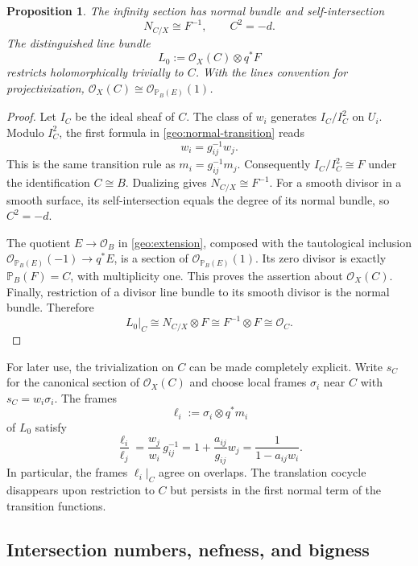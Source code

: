 \documentclass[11pt,a4paper]{article}
\numberwithin{equation}{section}
\newtheorem{proposition}[theorem]{Proposition}
\theoremstyle{definition}
\theoremstyle{remark}
\renewcommand{\P}{\mathbb P}
\newcommand{\OO}{\mathcal O}
\begin{document}
\begin{proposition}\label{geo:normal-and-L}
The infinity section has normal bundle and self-intersection
\[
  N_{C/X}\cong F^{-1},\qquad C^2=-d.
\]
The distinguished line bundle
\begin{equation}\label{geo:L-definition}
  L_0:=\OO_X(C)\otimes q^*F
\end{equation}
restricts holomorphically trivially to $C$.  With the lines convention
for projectivization, $\OO_X(C)\cong\OO_{\P_B(E)}(1)$.
\end{proposition}

\begin{proof}
Let $I_C$ be the ideal sheaf of $C$.  The class of $w_i$ generates
$I_C/I_C^2$ on $U_i$.  Modulo $I_C^2$, the first formula in
\eqref{geo:normal-transition} reads
\[
  w_i=g_{ij}^{-1}w_j.
\]
This is the same transition rule as $m_i=g_{ij}^{-1}m_j$.
Consequently $I_C/I_C^2\cong F$ under the identification $C\cong B$.
Dualizing gives $N_{C/X}\cong F^{-1}$.  For a smooth divisor in a
smooth surface, its self-intersection equals the degree of its normal
bundle, so $C^2=-d$.

The quotient $E\to\OO_B$ in \eqref{geo:extension}, composed with the
tautological inclusion $\OO_{\P_B(E)}(-1)\to q^*E$, is a section of
$\OO_{\P_B(E)}(1)$.  Its zero divisor is exactly $\P_B(F)=C$, with
multiplicity one.  This proves the assertion about $\OO_X(C)$.
Finally, restriction of a divisor line bundle to its smooth divisor
is the normal bundle.  Therefore
\[
  L_0|_C
   \cong N_{C/X}\otimes F
   \cong F^{-1}\otimes F
   \cong\OO_C.
\]
\end{proof}

For later use, the trivialization on $C$ can be made completely
explicit.  Write $s_C$ for the canonical section of $\OO_X(C)$ and
choose local frames $\sigma_i$ near $C$ with
$s_C=w_i\sigma_i$.  The frames
\[
  \ell_i:=\sigma_i\otimes q^*m_i
\]
of $L_0$ satisfy
\begin{equation}\label{geo:L-transition}
  \frac{\ell_i}{\ell_j}
   =\frac{w_j}{w_i}\,g_{ij}^{-1}
   =1+\frac{a_{ij}}{g_{ij}}w_j
   =\frac{1}{1-a_{ij}w_i}.
\end{equation}
In particular, the frames $\ell_i|_C$ agree on overlaps.  The
translation cocycle disappears upon restriction to $C$ but persists
in the first normal term of the transition functions.

\subsection{Intersection numbers, nefness, and bigness}
\end{document}
